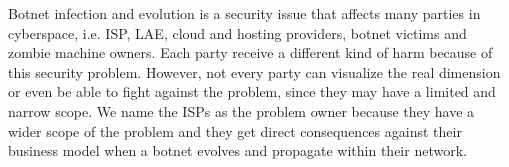 Botnet infection and evolution is a security issue that affects many parties in cyberspace, i.e. ISP, LAE, cloud and hosting providers, botnet victims and zombie machine owners. Each party receive a different kind of harm because of this security problem. However, not every party can visualize the real dimension or even be able to fight against the problem, since they may have a limited and narrow scope. We name the ISPs as the problem owner because they have a wider scope of the problem and they get direct consequences against their business model when a botnet evolves and propagate within their network.

